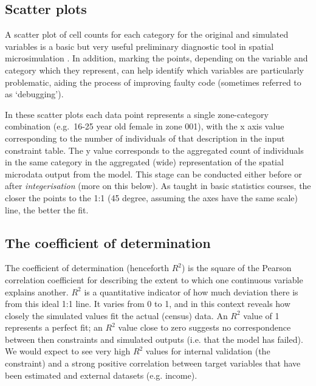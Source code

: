 \documentclass[a4paper,10pt]{article}
\begin{document}
% 
 

\subsection{Scatter plots}
A scatter plot of cell counts for each category for the original and simulated variables is
a basic but very useful preliminary diagnostic tool in spatial microsimulation
\citep{Ballas2005c,Edwards2009}.
In addition, marking the points, depending on the
variable and category %
which they represent, can help identify which variables are particularly problematic,
aiding the process of improving faulty code (sometimes referred to as `debugging').

In these scatter plots each data point represents a single zone-category
combination (e.g.~16-25 year old female in zone 001), with the x axis value corresponding
to the number of individuals of that description in the input constraint table.
The y value corresponds to the
aggregated count of individuals in the same category in the aggregated
(wide) representation of the spatial microdata output from the model. %
This stage can be conducted either before or after \emph{integerisation}
(more on this below). As taught in basic statistics courses, the closer the points to the
1:1 (45 degree, assuming the axes have the same scale) line, the better the fit.

\subsection{The coefficient of determination}
The coefficient of determination (henceforth $R^2$) is the 
square of the Pearson correlation coefficient for describing the
extent to which one continuous variable explains another.
$R^2$ is a quantitative
indicator of how much deviation there is from this ideal
1:1 line. It varies from 0 to 1,
and in this context reveals how closely the 
simulated values fit the actual (census) data.
An $R^2$ value of 1 represents a perfect fit; an $R^2$ value
close to zero suggests no correspondence
between then constraints and simulated outputs (i.e. that the model has failed).
We would expect to see very high $R^2$ values for
internal validation (the constraint) and a strong
positive correlation between target variables that have been estimated and
external datasets (e.g. income).
\end{document}
